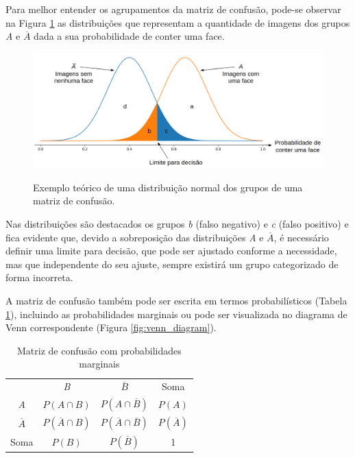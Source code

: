 Para melhor entender os agrupamentos da matriz de confusão, pode-se observar na Figura \ref{fig:norm_dist} as distribuições que representam a quantidade de imagens dos grupos \textit{A} e $\overline{A}$ dada a sua probabilidade de conter uma face. 

\begin{figure}[htbp]
    \centering
    \caption{Exemplo teórico de uma distribuição normal dos grupos de uma matriz de confusão.}
    \includegraphics[scale=.4]{figs/norm_dist.png}
    \label{fig:norm_dist}
 \end{figure}

 Nas distribuições são destacados os grupos \textit{b} (falso negativo) e \textit{c} (falso positivo) e fica evidente que, devido a sobreposição das distribuições \textit{A} e $\overline{A}$, é necessário definir uma limite para decisão, que pode ser ajustado conforme a necessidade, mas que independente do seu ajuste, sempre existirá um grupo categorizado de forma incorreta.

 A matriz de confusão também pode ser escrita em termos probabilísticos (Tabela \ref{tab:matriz_de_confusao_probab}), incluindo as probabilidades marginais ou pode ser visualizada no diagrama de Venn correspondente (Figura \ref{fig:venn_diagram}).

\begin{table}[htbp]
    \caption{Matriz de confusão com probabilidades marginais}
    \label{tab:matriz_de_confusao_probab}
    \centering
    \begin{tabular}{cccc}\hline\hline
        & \textit{B} & $\overline{B}$ & Soma\\
    \textit{A} & $P(A \cap B)$ & $P(A \cap \overline{B})$ & $P(A)$ \\
    $\overline{A}$ & $P(\overline{A} \cap B)$ & $P(\overline{A} \cap \overline{B})$ & $P(\overline{A})$ \\
    Soma & $P(B)$ & $P(\overline{B})$ & 1 \\
    \hline\hline
    \end{tabular}
\end{table}

